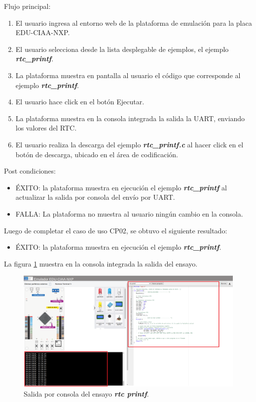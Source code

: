 Flujo principal:
\begin{enumerate}
	\item El usuario ingresa al entorno web de la plataforma de emulación para la placa EDU-CIAA-NXP.
	\item El usuario selecciona desde la lista desplegable de ejemplos, el ejemplo \textit{\textbf{rtc\_printf}}.
	\item La plataforma muestra en pantalla al usuario el código que corresponde al ejemplo \textit{\textbf{rtc\_printf}}.
	\item El usuario hace click en el botón \textquotedbl Ejecutar\textquotedbl.
	\item La plataforma muestra en la consola integrada la salida la UART, enviando los valores del RTC.
	\item El usuario realiza la descarga del ejemplo \textit{\textbf{rtc\_printf.c}} al hacer click en el botón de descarga, ubicado en el área de codificación.
\end{enumerate}

Post condiciones:
\begin{itemize}
	\item ÉXITO: la plataforma muestra en ejecución el ejemplo \textit{\textbf{rtc\_printf}} al actualizar la salida por consola del envío por UART.
	\item FALLA: La plataforma no muestra al usuario ningún cambio en la consola.
\end{itemize}

Luego de completar el caso de uso CP02, se obtuvo el siguiente resultado: 

\begin{itemize}
	\item ÉXITO: la plataforma muestra en ejecución el ejemplo \textit{\textbf{rtc\_printf}}.
\end{itemize}

La figura \ref{fig:rtcprintf} muestra en la consola integrada la salida del ensayo. 

\begin{figure}[ht]
	\centering
	\includegraphics[scale=.21]{./Figures/rtcprintf.png}
	\caption{Salida por consola del ensayo \textit{\textbf{rtc printf}}.}
	\label{fig:rtcprintf}
\end{figure}

